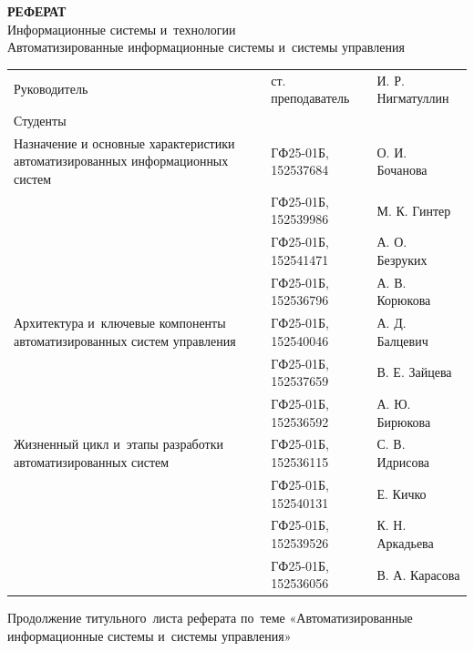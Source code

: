 \documentclass{ou}
\begin{document}
\thispagestyle{empty}
\begin{center}
\shortstack{\FGAVO}\vspace{4\baselineskip}
\textbf{РЕФЕРАТ}\\
Информационные системы и~технологии\\
Автоматизированные информационные системы и~системы управления\vspace{2\baselineskip}\end{center}
\begin{flushleft}
\doublespacing
\begin{tabularx}{\textwidth}{@{} p{} l l @{}}
Руководитель & ст. преподаватель & И. Р. Нигматуллин\\
Студенты     &                   &                  \\
\multirow{-2.27}{\hsize}{\singlespacing Назначение и основные характеристики автоматизированных информационных систем}
             & ГФ25-01Б, 152537684 & О. И. Бочанова\\
             & ГФ25-01Б, 152539986 & М. К. Гинтер\\
             & ГФ25-01Б, 152541471 & А. О. Безруких\\
             & ГФ25-01Б, 152536796 & А. В. Корюкова\\
\multirow{-2.27}{\hsize}{\singlespacing Архитектура и~ключевые компоненты автоматизированных систем управления}
             & ГФ25-01Б, 152540046 & А. Д. Балцевич\\
             & ГФ25-01Б, 152537659 & В. Е. Зайцева\\
             & ГФ25-01Б, 152536592 & А. Ю. Бирюкова\\    
\multirow{-2.27}{\hsize}{\singlespacing Жизненный цикл и~этапы разработки автоматизированных систем}
             & ГФ25-01Б, 152536115 & С. В. Идрисова\\
             & ГФ25-01Б, 152540131 & Е. Кичко\\
             & ГФ25-01Б, 152539526 & К. Н. Аркадьева\\
             & ГФ25-01Б, 152536056 & В. А. Карасова\\
\end{tabularx}
\end{flushleft}
\vspace*{\fill}
\begin{center}
\city
\end{center}
\newpage
\thispagestyle{empty}
Продолжение титульного~листа реферата по~теме «Автоматизированные информационные системы и~системы управления»
\end{document}
